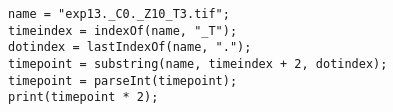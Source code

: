 \begin{lstlisting}
name = "exp13._C0._Z10_T3.tif";
timeindex = indexOf(name, "_T");
dotindex = lastIndexOf(name, ".");
timepoint = substring(name, timeindex + 2, dotindex);
timepoint = parseInt(timepoint);
print(timepoint * 2);

\end{lstlisting}